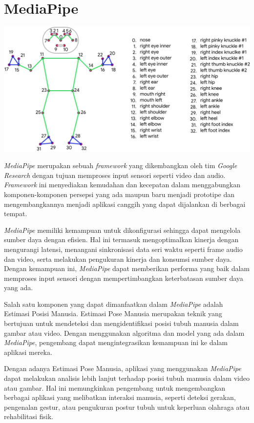 \section{MediaPipe}
\begin{center}
  \includegraphics[width=0.8\linewidth]{gambar/humanpose.jpg}
  \label{fig:Pose Tubuh dari MediaPipe}
\end{center}

\textit{MediaPipe} merupakan sebuah \textit{framework} yang dikembangkan oleh tim \textit{Google Research} dengan tujuan memproses input sensori seperti video dan audio. \textit{Framework} ini menyediakan kemudahan dan kecepatan dalam menggabungkan komponen-komponen persepsi yang ada maupun baru menjadi prototipe dan mengembangkannya menjadi aplikasi canggih yang dapat dijalankan di berbagai tempat. \cite{lugaresi2019mediapipe}

\textit{MediaPipe} memiliki kemampuan untuk dikonfigurasi sehingga dapat mengelola sumber daya dengan efisien. Hal ini termasuk mengoptimalkan kinerja dengan mengurangi latensi, menangani sinkronisasi data seri waktu seperti frame audio dan video, serta melakukan pengukuran kinerja dan konsumsi sumber daya. Dengan kemampuan ini, \textit{MediaPipe} dapat memberikan performa yang baik dalam memproses input sensori dengan mempertimbangkan keterbatasan sumber daya yang ada.

Salah satu komponen yang dapat dimanfaatkan dalam \textit{MediaPipe} adalah Estimasi Posisi Manusia. Estimasi Pose Manusia merupakan teknik yang bertujuan untuk mendeteksi dan mengidentifikasi posisi tubuh manusia dalam gambar atau video. Dengan menggunakan algoritma dan model yang ada dalam \textit{MediaPipe}, pengembang dapat mengintegrasikan kemampuan ini ke dalam aplikasi mereka.

Dengan adanya Estimasi Pose Manusia, aplikasi yang menggunakan \textit{MediaPipe} dapat melakukan analisis lebih lanjut terhadap posisi tubuh manusia dalam video atau gambar. Hal ini memungkinkan pengembang untuk mengembangkan berbagai aplikasi yang melibatkan interaksi manusia, seperti deteksi gerakan, pengenalan gestur, atau pengukuran postur tubuh untuk keperluan olahraga atau rehabilitasi fisik.

